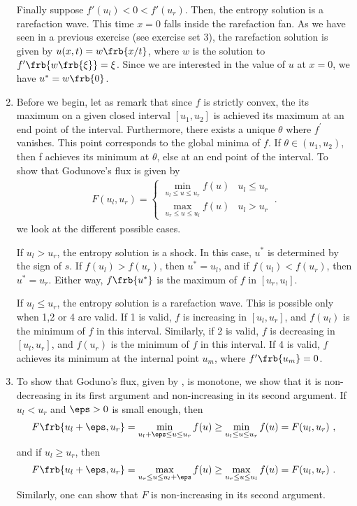 \documentclass{article}
\begin{document}
\begin{exerciseList}
\begin{enumerate}
Finally suppose $f'(u_l) < 0 < f'(u_r)$.
Then, the entropy solution is a rarefaction wave.
This time $x=0$ falls inside the rarefaction fan.
As we have seen in a previous exercise (see exercise set 3), the rarefaction solution is given by $u(x,t)=w\frb{x/t}$, where $w$ is the solution to $f'\frb{w\frb{\xi}}=\xi$.
Since we are interested in the value of $u$ at $x=0$, we have $u^*=w\frb{0}$.

\item
Before we begin, let as remark that since $f$ is strictly convex, the its maximum on a given closed interval $[u_1,u_2]$ is achieved its maximum at an end point of the interval. Furthermore, there exists a unique $\theta$ where $f^\prime$ vanishes. This point corresponds to the global minima of $f$. If $\theta \in (u_1,u_2)$, then f achieves its minimum at $\theta$, else at an end point of the interval.
To show that Godunove's flux is given by
\begin{gather} \label{GodFlx}
	F(u_l,u_r)=\begin{cases}
			\displaystyle
			\min_{u_l\le u\le u_r} f(u) & u_l\le u_r \\[1em]
			\displaystyle
			\max_{u_r\le u\le u_l} f(u) & u_l> u_r 
		\end{cases}\ .
\end{gather}
we look at the different possible cases.

If $u_l>u_r$, the entropy solution is a shock.
In this case, $u^*$ is determined by the sign of $s$.
If $f(u_l)>f(u_r)$, then $u^*=u_l$, and if $f(u_l)<f(u_r)$, then $u^*=u_r$.
Either way, $f\frb{u^*}$ is the maximum of $f$ in $[u_r,u_l]$.

If $u_l\le u_r$, the entropy solution is a rarefaction wave.
This is possible only when 1,2 or 4 are valid.
If 1 is valid, $f$ is increasing in $[u_l,u_r]$, and $f(u_l)$ is the minimum of $f$ in this interval.
Similarly, if 2 is valid, $f$ is decreasing in $[u_l,u_r]$, and $f(u_r)$ is the minimum of $f$ in this interval.
If 4 is valid, $f$ achieves its minimum at the internal point $u_m$, where $f'\frb{u_m}=0$.


\item
To show that Goduno's flux, given by , is monotone, we show that it is non-decreasing in its first argument and non-increasing in its second argument.
If $u_l<u_r$ and $\eps>0$ is small enough, then
\begin{gather}
	F\frb{u_l+\eps,u_r}=\min_{u_l+\eps\le u\le u_r} f(u) \ge \min_{u_l\le u\le u_r} f(u)
		=F(u_l,u_r)\ ,
\end{gather}
and if $u_l\ge u_r$, then
\begin{gather}
	F\frb{u_l+\eps,u_r}=\max_{u_r\le u\le u_l+\eps} f(u) \ge \max_{u_r\le u\le u_l} f(u)
		=F(u_l,u_r)\ .
\end{gather}
Similarly, one can show that $F$ is non-increasing in its second argument.
\end{enumerate}




\end{exerciseList}
\end{document}
